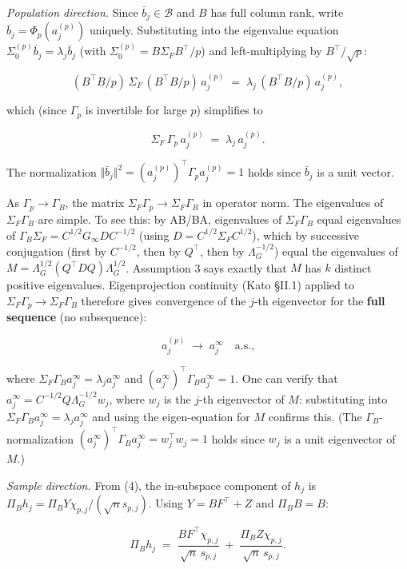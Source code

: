 \documentclass{article}
\theoremstyle{remark}
\begin{document}
\textit{Population direction.} Since $\bar{b}_j \in \mathcal{B}$ and $B$ has full column rank, write $\bar{b}_j = \Phi_p(a_j^{(p)})$ uniquely. Substituting into the eigenvalue equation $\Sigma_0^{(p)}\bar{b}_j = \lambda_j\bar{b}_j$ (with $\Sigma_0^{(p)} = B\Sigma_F B^\top/p$) and left-multiplying by $B^\top/\sqrt{p}$:

\[
(B^\top B/p)\,\Sigma_F\,(B^\top B/p)\,a_j^{(p)} \;=\; \lambda_j\,(B^\top B/p)\,a_j^{(p)},
\]

which (since $\Gamma_p$ is invertible for large $p$) simplifies to

\[
\Sigma_F\,\Gamma_p\,a_j^{(p)} \;=\; \lambda_j\,a_j^{(p)}.
\]

The normalization $\Vert \bar{b}_j\Vert^2 = (a_j^{(p)})^\top\Gamma_p a_j^{(p)} = 1$ holds since $\bar{b}_j$ is a unit vector.

As $\Gamma_p \to \Gamma_B$, the matrix $\Sigma_F\Gamma_p \to \Sigma_F\Gamma_B$ in operator norm. The eigenvalues of $\Sigma_F\Gamma_B$ are simple. To see this: by AB/BA, eigenvalues of $\Sigma_F\Gamma_B$ equal eigenvalues of $\Gamma_B\Sigma_F = C^{1/2}G_\infty D C^{-1/2}$ (using $D = C^{1/2}\Sigma_F C^{1/2}$), which by successive conjugation (first by $C^{-1/2}$, then by $Q^\top$, then by $\Lambda_G^{-1/2}$) equal the eigenvalues of $M = \Lambda_G^{1/2}(Q^\top DQ)\Lambda_G^{1/2}$. Assumption 3 says exactly that $M$ has $k$ distinct positive eigenvalues. Eigenprojection continuity (Kato §II.1) applied to $\Sigma_F\Gamma_p \to \Sigma_F\Gamma_B$ therefore gives convergence of the $j$-th eigenvector for the \textbf{full sequence} (no subsequence):

\[
a_j^{(p)} \;\longrightarrow\; a_j^\infty \quad\text{a.s.,}
\]

where $\Sigma_F\Gamma_B a_j^\infty = \lambda_j a_j^\infty$ and $(a_j^\infty)^\top\Gamma_B a_j^\infty = 1$. One can verify that $a_j^\infty = C^{-1/2}Q\Lambda_G^{-1/2}w_j$, where $w_j$ is the $j$-th eigenvector of $M$: substituting into $\Sigma_F\Gamma_B a_j^\infty = \lambda_j a_j^\infty$ and using the eigen-equation for $M$ confirms this. (The $\Gamma_B$-normalization $(a_j^\infty)^\top\Gamma_B a_j^\infty = w_j^\top w_j = 1$ holds since $w_j$ is a unit eigenvector of $M$.)

\textit{Sample direction.} From (4), the in-subspace component of $h_j$ is $\Pi_B h_j = \Pi_B Y\chi_{p,j}/(\sqrt{n}s_{p,j})$. Using $Y = BF^\top + Z$ and $\Pi_B B = B$:

\[
\Pi_B h_j \;=\; \frac{BF^\top\chi_{p,j}}{\sqrt{n}\,s_{p,j}} \;+\; \frac{\Pi_B Z\chi_{p,j}}{\sqrt{n}\,s_{p,j}}.
\]
\end{document}
